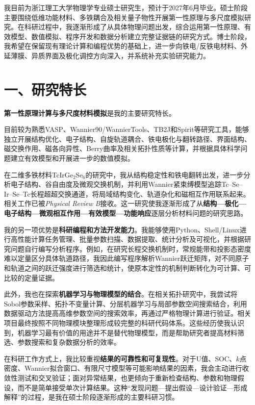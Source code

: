 我目前为浙江理工大学物理学专业硕士研究生，预计于2027年6月毕业。硕士阶段主要围绕低维功能材料、多铁耦合及相关量子物性开展第一性原理与多尺度模拟研究。在科研过程中，我逐渐形成了从具体物理问题出发，综合运用第一性原理、有效模型、数值模拟、程序开发和数据分析建立完整证据链的研究方式。博士阶段，我希望在保留现有理论计算和编程优势的基础上，进一步向铁电/反铁电材料、外延薄膜、异质界面及极化调控方向深入，并系统补充实验研究能力。

\section{一、研究特长}

\textbf{第一性原理计算与多尺度材料模拟}是我的主要研究特长。\par
目前较为熟悉VASP、Wannier90/WannierTools、TB2J和Spirit等研究工具，能够独立开展结构优化、电子结构、自旋轨道耦合、铁电极化与翻转路径、界面结构、磁交换作用、磁各向异性、Berry曲率及相关拓扑性质等计算，并根据具体科学问题建立有效模型和开展进一步的数值模拟。

在二维多铁材料TcIrGe$_2$Se$_6$的研究中，我从结构稳定性和铁电翻转出发，进一步分析电子结构、谷自由度及微观交换机制，并利用Wannier紧束缚模型追踪Tc--Se--Ir--Se--Tc长程超超交换通道，将局域结构变化、轨道杂化和磁相互作用联系起来。相关工作已被\textit{Physical Review B}接收。这一研究使我逐渐形成了从\textbf{结构—极化—电子结构—微观相互作用—有效模型—功能响应}逐层分析材料问题的研究思路。

我的另一项优势是\textbf{科研编程和方法开发能力}。我能够使用Python、Shell/Linux进行高性能计算任务管理、批量参数扫描、数据提取、统计分析及可视化，并根据研究问题自行编写分析程序。例如，在研究长程交换机制时，常规能带和投影态密度难以定量区分具体轨道路径，我因此编写程序解析Wannier跃迁矩阵，对不同原子和轨道之间的跃迁强度进行筛选和统计，使原本定性的机制判断转化为可计算、可比较的定量证据。

此外，我也在探索\textbf{机器学习与物理模型的结合}。在相关拓扑研究中，我尝试将Sobol参数采样、拓扑不变量计算、分层机器学习与局部参数空间搜索结合，利用数据驱动方法提高高维参数空间的搜索效率，再通过严格物理计算进行验证。相关项目最终按照不同物理模块整理形成较完整的科研代码体系。这些经历使我认识到，机器学习最有价值的用途并不是替代物理模型，而是帮助研究者提高材料筛选、参数搜索和复杂数据分析的效率。

在科研工作方式上，我比较重视\textbf{结果的可靠性和可复现性}。对于U值、SOC、$k$点密度、Wannier拟合窗口、有限尺寸模型等可能影响结果的因素，我会主动进行收敛性测试和交叉验证；面对异常结果，也更倾向于重新检查结构、参数和物理假设，而不是简单接受单次计算结果。这种“发现问题—提出假设—设计验证—形成解释”的过程，是我在硕士阶段逐渐形成的主要科研习惯。

